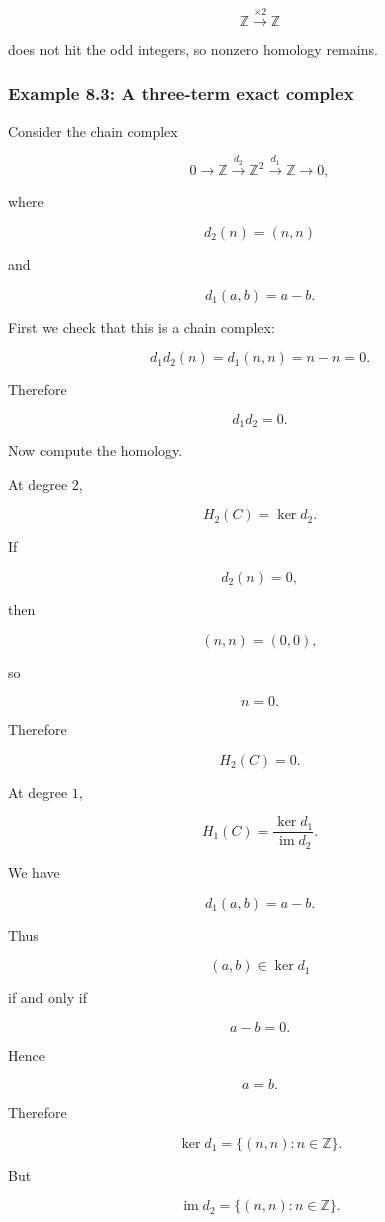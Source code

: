 \documentclass[12pt,a4paper]{article}
\theoremstyle{notespace}
\begin{document}
\[
\mathbb Z\xrightarrow{\times 2}\mathbb Z
\]

does not hit the odd integers, so nonzero homology remains.

\subsubsection{Example 8.3: A three-term exact complex}

Consider the chain complex

\[
0\longrightarrow \mathbb Z
\xrightarrow{d_2}
\mathbb Z^2
\xrightarrow{d_1}
\mathbb Z
\longrightarrow 0,
\]

where

\[
d_2(n)=(n,n)
\]

and

\[
d_1(a,b)=a-b.
\]

First we check that this is a chain complex:

\[
d_1d_2(n)=d_1(n,n)=n-n=0.
\]

Therefore

\[
d_1d_2=0.
\]

Now compute the homology.

At degree \(2\),

\[
H_2(C)=\ker d_2.
\]

If

\[
d_2(n)=0,
\]

then

\[
(n,n)=(0,0),
\]

so

\[
n=0.
\]

Therefore

\[
H_2(C)=0.
\]

At degree \(1\),

\[
H_1(C)=\frac{\ker d_1}{\operatorname{im}d_2}.
\]

We have

\[
d_1(a,b)=a-b.
\]

Thus

\[
(a,b)\in \ker d_1
\]

if and only if

\[
a-b=0.
\]

Hence

\[
a=b.
\]

Therefore

\[
\ker d_1
=
\{(n,n):n\in\mathbb Z\}.
\]

But

\[
\operatorname{im}d_2
=
\{(n,n):n\in\mathbb Z\}.
\]
\end{document}
